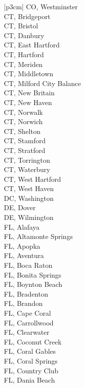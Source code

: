 \begin{customLongTable}{ |p{3cm}| }
CO, Westminster \\ \hline
CT, Bridgeport \\ \hline
CT, Bristol \\ \hline
CT, Danbury \\ \hline
CT, East Hartford \\ \hline
CT, Hartford \\ \hline
CT, Meriden \\ \hline
CT, Middletown \\ \hline
CT, Milford City Balance \\ \hline
CT, New Britain \\ \hline
CT, New Haven \\ \hline
CT, Norwalk \\ \hline
CT, Norwich \\ \hline
CT, Shelton \\ \hline
CT, Stamford \\ \hline
CT, Stratford \\ \hline
CT, Torrington \\ \hline
CT, Waterbury \\ \hline
CT, West Hartford \\ \hline
CT, West Haven \\ \hline
DC, Washington \\ \hline
DE, Dover \\ \hline
DE, Wilmington \\ \hline
FL, Alafaya \\ \hline
FL, Altamonte Springs \\ \hline
FL, Apopka \\ \hline
FL, Aventura \\ \hline
FL, Boca Raton \\ \hline
FL, Bonita Springs \\ \hline
FL, Boynton Beach \\ \hline
FL, Bradenton \\ \hline
FL, Brandon \\ \hline
FL, Cape Coral \\ \hline
FL, Carrollwood \\ \hline
FL, Clearwater \\ \hline
FL, Coconut Creek \\ \hline
FL, Coral Gables \\ \hline
FL, Coral Springs \\ \hline
FL, Country Club \\ \hline
FL, Dania Beach \\ \hline

\end{customLongTable}
